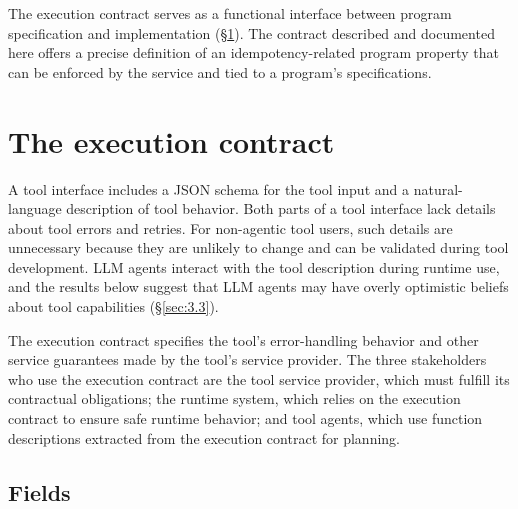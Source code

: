 \documentclass[letterpaper,twocolumn,10pt]{article}
\begin{document}
The execution contract serves as a functional interface between program specification and implementation (\S\ref{sec:3}). The contract described and documented here offers a precise definition of an idempotency-related program property that can be enforced by the service and tied to a program's specifications.

\section{The execution contract}\label{sec:3}

A tool interface includes a JSON schema for the tool input and a natural-language description of tool behavior. Both parts of a tool interface lack details about tool errors and retries. For non-agentic tool users, such details are unnecessary because they are unlikely to change and can be validated during tool development. LLM agents interact with the tool description during runtime use, and the results below suggest that LLM agents may have overly optimistic beliefs about tool capabilities (\S\ref{sec:3.3}).

The execution contract specifies the tool's error-handling behavior and other service guarantees made by the tool's service provider. The three stakeholders who use the execution contract are the tool service provider, which must fulfill its contractual obligations; the runtime system, which relies on the execution contract to ensure safe runtime behavior; and tool agents, which use function descriptions extracted from the execution contract for planning.

\subsection{Fields}\label{sec:3.1}
\end{document}
